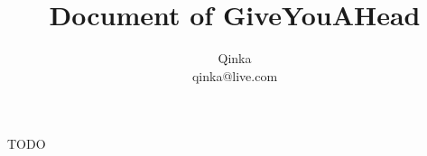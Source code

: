 \documentclass[UTF8]{ctexart} %
\title{Document of GiveYouAHead}
\author{Qinka\\qinka@live.com}
\begin{document}
\maketitle
TODO
\end{document}
